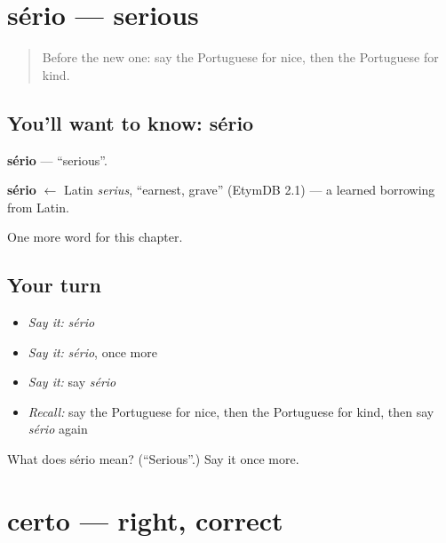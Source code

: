 \section[sério]{sério — serious}

\label{lesson:PT-C124-serio}



\begin{quote}
Before the new one: say the Portuguese for nice, then the Portuguese for kind.
\end{quote}

\subsection*{You'll want to know: sério}
\textbf{sério} — \textquotedblleft{}serious\textquotedblright{}.

\begin{cousinweb}
\textbf{sério} $\leftarrow$ Latin \emph{serius}, \textquotedblleft{}earnest, grave\textquotedblright{} (EtymDB 2.1) — a learned borrowing from Latin.
\end{cousinweb}

\begin{grammarlens}[title={What you've built}]
One more word for this chapter.
\end{grammarlens}

\subsection*{Your turn}
\begin{itemize}
\raggedright
  \item \emph{Say it:} \emph{sério}
  \item \emph{Say it:} \emph{sério}, once more
  \item \emph{Say it:} say \emph{sério}
  \item \emph{Recall:} say the Portuguese for nice, then the Portuguese for kind, then say \emph{sério} again
\end{itemize}

\begin{tcolorbox}[breakable,colback=teal!4,colframe=teal!35!black,title={Before you move on}]
What does sério mean? (\textquotedblleft{}Serious\textquotedblright{}.) Say it once more.
\end{tcolorbox}
\section[certo]{certo — right, correct}

